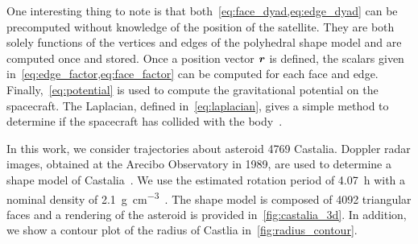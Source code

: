 \documentclass[]{aiaa-tc}%
\begin{document}
One interesting thing to note is that both~\cref{eq:face_dyad,eq:edge_dyad} can be precomputed without knowledge of the position of the satellite.
They are both solely functions of the vertices and edges of the polyhedral shape model and are computed once and stored.
Once a position vector \( \bm{r} \) is defined, the scalars given in~\cref{eq:edge_factor,eq:face_factor} can be computed for each face and edge.
Finally,~\cref{eq:potential} is used to compute the gravitational potential on the spacecraft.
The Laplacian, defined in~\cref{eq:laplacian}, gives a simple method to determine if the spacecraft has collided with the body~\cite{werner1996}. 

In this work, we consider trajectories about asteroid 4769 Castalia.
Doppler radar images, obtained at the Arecibo Observatory in 1989, are used to determine a shape model of Castalia~\cite{hudson1994,neese2004}.
We use the estimated rotation period of \SI{4.07}{\hour} with a nominal density of \SI{2.1}{\gram\per\centi\meter\cubed}~\cite{scheeres1996}.
The shape model is composed of \num{4092} triangular faces and a rendering of the asteroid is provided in~\cref{fig:castalia_3d}.
In addition, we show a contour plot of the radius of Castlia in~\cref{fig:radius_contour}.
\end{document}
